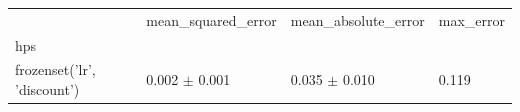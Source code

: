 \begin{tabular}{llll}
\toprule
 & mean_squared_error & mean_absolute_error & max_error \\
hps &  &  &  \\
\midrule
frozenset({'lr', 'discount'}) & 0.002 $\pm$ 0.001 & 0.035 $\pm$ 0.010 & 0.119 \\
\bottomrule
\end{tabular}
